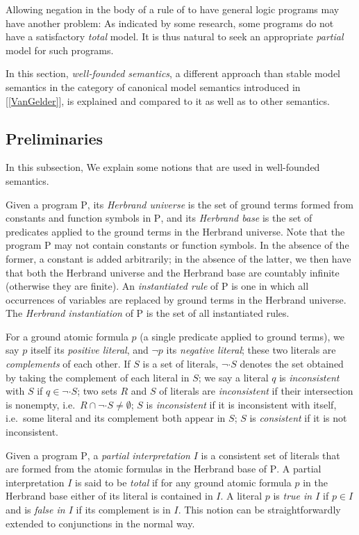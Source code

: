 Allowing negation in the body of a rule of to have general logic programs may have another problem: As indicated by some research, some programs do not have a satisfactory \emph{total} model. It is thus natural to seek an appropriate \emph{partial} model for such programs.

In this section, \emph{well-founded semantics}, a different approach than stable model semantics in the category of canonical model semantics introduced in [\ref{VanGelder}], is explained and compared to it as well as to other semantics.

\subsection{Preliminaries}
In this subsection, We explain some notions that are used in well-founded semantics.

Given a program $\mathrm{P}$, its \emph{Herbrand universe} is the set of ground terms formed from constants and function symbols in $\mathrm{P}$, and its \emph{Herbrand base} is the set of predicates applied to the ground terms in the Herbrand universe. Note that the program $\mathrm{P}$ may not contain constants or function symbols. In the absence of the former, a constant is added arbitrarily; in the absence of the latter, we then have that both the Herbrand universe and the Herbrand base are countably infinite (otherwise they are finite). An \emph{instantiated rule} of $\mathrm{P}$ is one in which all occurrences of variables are replaced by ground terms in the Herbrand universe. The \emph{Herbrand instantiation} of $\mathrm{P}$ is the set of all instantiated rules.

For a ground atomic formula $p$ (a single predicate applied to ground terms), we say $p$ itself its \emph{positive literal}, and $\neg p$ its \emph{negative literal}; these two literals are \emph{complements} of each other. If $S$ is a set of literals, $\neg \cdot S$ denotes the set obtained by taking the complement of each literal in $S$; we say a literal $q$ is \emph{inconsistent} with $S$ if $q \in \neg \cdot S$; two sets $R$ and $S$ of literals are \emph{inconsistent} if their intersection is nonempty, i.e.\ $R \cap \neg \cdot S \neq \emptyset$; $S$ is \emph{inconsistent} if it is inconsistent with itself, i.e.\ some literal and its complement both appear in $S$; $S$ is \emph{consistent} if it is not inconsistent.

Given a program $\mathrm{P}$, a \emph{partial interpretation} $I$ is a consistent set of literals that are formed from the atomic formulas in the Herbrand base of $\mathrm{P}$. A partial interpretation $I$ is said to be \emph{total} if for any ground atomic formula $p$ in the Herbrand base either of its literal is contained in $I$. A literal $p$ is \emph{true in $I$} if $p \in I$ and is \emph{false in $I$} if its complement is in $I$. This notion can be straightforwardly extended to conjunctions in the normal way.

